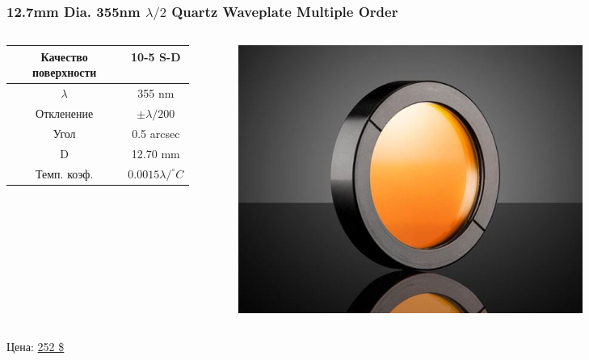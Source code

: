 \documentclass[handout]{beamer}
\begin{document}
\begin{frame}
    \frametitle{12.7mm Dia. 355nm $\lambda / 2$ Quartz Waveplate Multiple Order}
    \begin{columns}
        \begin{column}{0.5\textwidth}
            \begin{tabular}{c||c}
                Качество поверхности & 10-5 S-D \\ \hline
                $\lambda$ & 355 nm \\ \hline
                Откленение & $\pm \lambda /200$ \\ \hline
                Угол & 0.5 arcsec \\ \hline
                D & 12.70 mm \\ \hline
                Темп. коэф. &  $ 0.0015  \lambda / ^\circ C$
            \end{tabular}
        \end{column}

        \begin{column}{0.5\textwidth}
            \begin{figure}[h]
                \centering
                \includegraphics[width=0.8\textwidth]{1.jpg}
            \end{figure}
        \end{column}
    \end{columns}

    Цена: \href{https://www.edmundoptics.com/p/127mm-dia-355nm-lambda2-quartz-waveplate-multiple-order/28055/}{252 \$}
\end{frame}
\end{document}
